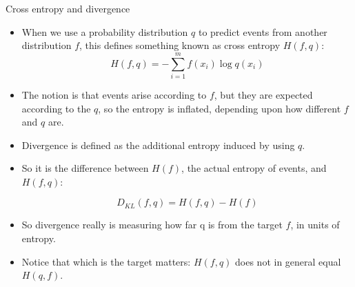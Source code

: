 \documentclass[handout]{beamer}
\begin{document}
\begin{frame}{Cross entropy and divergence}
\scriptsize{

\begin{itemize}



\item  When we use a probability distribution $q$ to predict events from another
distribution $f$, this defines something known as cross entropy $H(f,q)$:
\begin{equation}
 H(f,q) = - \sum_{i=1}^{m}f(x_i)\log q(x_i)
\end{equation}

\item The notion is that events arise according to $f$, but they are expected according to the $q$, so the entropy is inflated, depending upon how different $f$ and $q$ are.

\item Divergence is defined as the additional entropy induced by using $q$.

\item So it is the difference between $H(f)$, the actual entropy of events, and $H(f, q)$:

\begin{equation}
 D_{KL}(f,q) = H(f,q)-H(f)
\end{equation}

\item So divergence really is measuring how far q is from the target $f$, in units of entropy.

\item Notice that which is the target matters: $H(f, q)$ does not in general equal $H(q, f)$.

\end{itemize}


} 
\end{frame}
\end{document}
